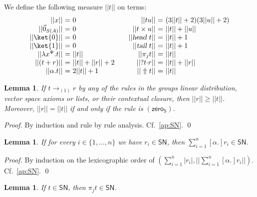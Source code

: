 \documentclass[preprint]{elsarticle}
\newtheorem{lemma}[theorem]{Lemma}
\newcommand\size[1]{||#1||}
\newcommand\SN{\mathsf{SN}}
\newcommand\lra[1][1]{\longrightarrow_{\left(#1\right)}}
\newcommand\ite[3]{{#1}?{#2}\mathord{\cdot}{#3}}
\newcommand\pair[2]{({#1}+{#2})}
\newcommand\s[1]{\ensuremath{\mathsf{#1}}}
\newcommand\head{\text{\sl head}}
\newcommand\tail{\text{\sl tail}}
\newcommand\z[1][A]{\vec 0_{S(#1)}}
\newcommand\may[1][\alpha]{[{#1}.]}
\newcommand\rzeroS{(\s{zero_S})}
\begin{document}
\begin{definition}
  We define the following measure $\size t$ on terms:
  \[
    \begin{array}{r@{~=~}l@{\qquad}r@{~=~}l}
      \size{x} & 0 &
      \size{tu} &  (3 \size{t} + 2)(3 \size{u} + 2) \\
      \size{\z} &  0 &
                        \size{t \times u} &  \size{t} + \size{u} \\
      \size{\ket{0}} &  0 &
                             \size{\head\ {t}} &  \size{t} + 1 \\
      \size{\ket{1}} &  0 &
                             \size{\tail\ {t}} &  \size{t} + 1 \\
      \size{\lambda x^\Psi.t} &  \size{t} &
                                             \size{\pi_{j}{t}} &  \size{t} \\
      \size{\pair tr} &  \size{t} + \size{r} + 2 &
                                                    \size{\ite{}{t}{r}} &  \size{t} + \size{r} \\
      \size{\alpha . t} &  2 \size{t} + 1 &
                                                       \size{\Uparrow t} &  \size{t}
    \end{array}
  \]
\end{definition}

\begin{lemma}\label{lem:size}
  If \( t \lra r \) by any of the rules in the groups linear distribution,
  vector space axioms or lists, or their contextual closure, then $\size r \geq \size t$. Moreover, $\size r
  = \size t$ if and only if the rule is $\rzeroS$.
\end{lemma}
\begin{proof}
  By induction and rule by rule analysis. Cf.~\ref{ap:SN}.
  \qed
\end{proof}

\begin{lemma}\label{lem:ri_in_snset_implies_sum_ri_in_snset}
  If for every \( i \in \{1, \ldots, n\} \) we have \( r_i \in \SN \),
  then \( \sum_{i = 1}^{n} \may r_i \in \SN \).
\end{lemma}
\begin{proof}
  By induction on the lexicographic order of \( (\sum_{i = 1}^{n} |r_i|,
  \size{\sum_{i = 1}^{n} \may r_i}) \). Cf.~\ref{ap:SN}. \qed
\end{proof}

\begin{lemma}\label{lem:t_implies_proj_t}
  If \( t \in \SN \), then \( \pi_{j}{t} \in \SN \).
\end{lemma}
\end{document}
